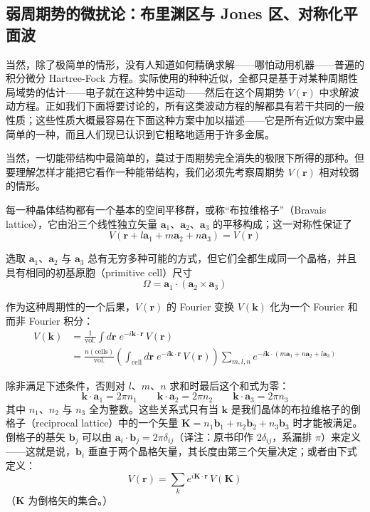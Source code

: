 \subsection{弱周期势的微扰论：布里渊区与 Jones 区、对称化平面波}

当然，除了极简单的情形，没有人知道如何精确求解——哪怕动用机器——普遍的积分微分 Hartree-Fock 方程。实际使用的种种近似，全都只是基于对某种周期性局域势的估计——电子就在这种势中运动——然后在这个周期势 $V(\mathbf{r})$ 中求解波动方程。正如我们下面将要讨论的，所有这类波动方程的解都具有若干共同的一般性质；这些性质大概最容易在下面这种方案中加以描述——它是所有近似方案中最简单的一种，而且人们现已认识到它粗略地适用于许多金属。

当然，一切能带结构中最简单的，莫过于周期势完全消失的极限下所得的那种。但要理解怎样才能把它看作一种能带结构，我们必须先考察周期势 $V(\mathbf{r})$ 相对较弱的情形。

每一种晶体结构都有一个基本的空间平移群，或称“布拉维格子”（Bravais lattice），它由沿三个线性独立矢量 $\mathbf{a}_1$、$\mathbf{a}_2$、$\mathbf{a}_3$ 的平移构成；这一对称性保证了
\begin{equation*}
V(\mathbf{r} + l\mathbf{a}_1 + m\mathbf{a}_2 + n\mathbf{a}_3) = V(\mathbf{r})
\end{equation*}

选取 $\mathbf{a}_1$、$\mathbf{a}_2$ 与 $\mathbf{a}_3$ 总有无穷多种可能的方式，但它们全都生成同一个晶格，并且具有相同的初基原胞（primitive cell）尺寸
\begin{equation*}
\Omega = \mathbf{a}_1 \cdot (\mathbf{a}_2 \times \mathbf{a}_3)
\end{equation*}

作为这种周期性的一个后果，$V(\mathbf{r})$ 的 Fourier 变换 $V(\mathbf{k})$ 化为一个 Fourier 和而非 Fourier 积分：
\begin{align*}
V(\mathbf{k}) &= \frac{1}{\text{vol.}} \int d\mathbf{r}\; e^{-i\mathbf{k}\cdot\mathbf{r}}\,V(\mathbf{r}) \\
&= \frac{n(\text{cells})}{\text{vol.}} \left( \int_{\text{cell}} d\mathbf{r}\; e^{-i\mathbf{k}\cdot\mathbf{r}}\,V(\mathbf{r}) \right) \sum_{m,l,n} e^{-i\mathbf{k}\cdot(m\mathbf{a}_1 + n\mathbf{a}_2 + l\mathbf{a}_3)}
\end{align*}

除非满足下述条件，否则对 $l$、$m$、$n$ 求和时最后这个和式为零：
\begin{equation*}
\mathbf{k}\cdot\mathbf{a}_1 = 2\pi n_1 \qquad \mathbf{k}\cdot\mathbf{a}_2 = 2\pi n_2 \qquad \mathbf{k}\cdot\mathbf{a}_3 = 2\pi n_3
\end{equation*}
其中 $n_1$、$n_2$ 与 $n_3$ 全为整数。这些关系式只有当 $\mathbf{k}$ 是我们晶体的布拉维格子的倒格子（reciprocal lattice）中的一个矢量 $\mathbf{K} = n_1\mathbf{b}_1 + n_2\mathbf{b}_2 + n_3\mathbf{b}_3$ 时才能被满足。倒格子的基矢 $\mathbf{b}_j$ 可以由 $\mathbf{a}_i\cdot\mathbf{b}_j = 2\pi\delta_{ij}$（译注：原书印作 $2\delta_{ij}$，系漏排 $\pi$）来定义——这就是说，$\mathbf{b}_i$ 垂直于两个晶格矢量，其长度由第三个矢量决定；或者由下式定义：
\begin{equation*}
V(\mathbf{r}) = \sum_k e^{i\mathbf{K}\cdot\mathbf{r}}\,V(\mathbf{K}) \tag{10}
\end{equation*}
（$\mathbf{K}$ 为倒格矢的集合。）

